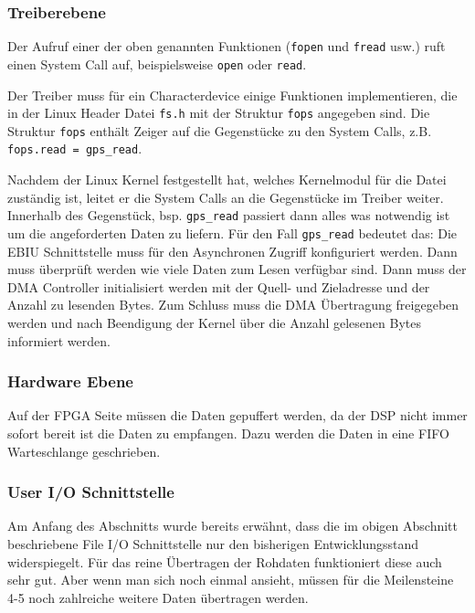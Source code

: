 
\subsubsection{Treiberebene}
Der Aufruf einer der oben genannten Funktionen (\lstinline$fopen$ und \lstinline$fread$ usw.) ruft einen System Call auf, beispielsweise  \lstinline$open$ oder \lstinline$read$. 

Der Treiber muss für ein Characterdevice einige Funktionen implementieren, die in der Linux Header Datei \lstinline$fs.h$ mit der Struktur \lstinline$fops$ angegeben sind. Die Struktur \lstinline$fops$ enthält Zeiger auf die Gegenstücke zu den System Calls, z.B. \lstinline$fops.read = gps_read$.

Nachdem der Linux Kernel festgestellt hat, welches Kernelmodul für die Datei zuständig ist, leitet er die System Calls an die Gegenstücke im Treiber weiter. Innerhalb des Gegenstück, bsp. \lstinline$gps_read$ passiert dann alles was notwendig ist um die angeforderten Daten zu liefern. Für den Fall \lstinline$gps_read$ bedeutet das: Die EBIU Schnittstelle muss für den Asynchronen Zugriff konfiguriert werden. Dann muss überprüft werden wie viele Daten zum Lesen verfügbar sind. Dann muss der DMA Controller initialisiert werden mit der Quell- und Zieladresse und der Anzahl zu lesenden Bytes. Zum Schluss muss die DMA Übertragung freigegeben werden und nach Beendigung der Kernel über die Anzahl gelesenen Bytes informiert werden.

\subsubsection{Hardware Ebene}
Auf der FPGA Seite müssen die Daten gepuffert werden, da der DSP nicht immer sofort bereit ist die Daten zu empfangen. Dazu werden die Daten in eine \gls{FIFO} Warteschlange geschrieben. 

\subsubsection{User I/O Schnittstelle}
Am Anfang des Abschnitts wurde bereits erwähnt, dass die im obigen Abschnitt beschriebene File I/O Schnittstelle nur den bisherigen Entwicklungsstand widerspiegelt. Für das reine Übertragen der Rohdaten funktioniert diese auch sehr gut. Aber wenn man sich noch einmal  ansieht, müssen für die Meilensteine 4-5 noch zahlreiche weitere Daten übertragen werden. 

